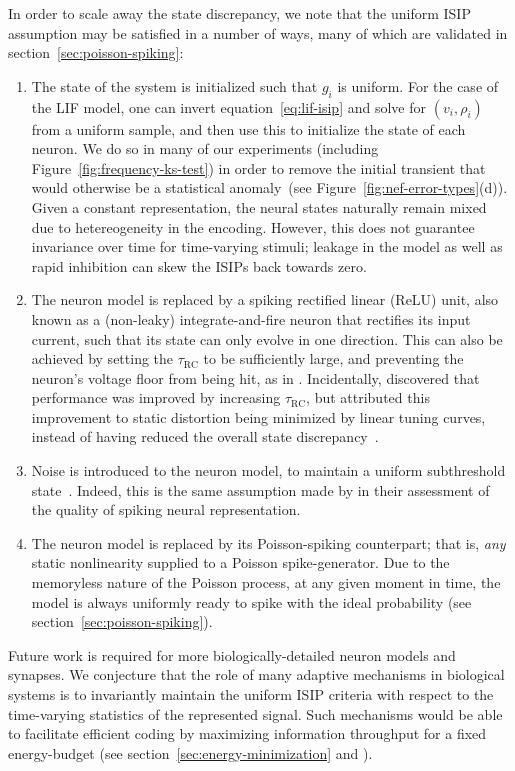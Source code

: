 In order to scale away the state discrepancy, we note that the uniform ISIP assumption may be satisfied in a number of ways, many of which are validated in
section~\ref{sec:poisson-spiking}:
\begin{enumerate}
\item The state of the system is initialized such that $g_i$ is uniform.
For the case of the LIF model, one can invert equation~\ref{eq:lif-isip} and solve for $(v_i, \rho_i)$ from a uniform sample, and then use this to initialize the state of each neuron.
We do so in many of our experiments (including Figure~\ref{fig:frequency-ks-test}) in order to remove the initial transient that would otherwise be a statistical anomaly~(see Figure~\ref{fig:nef-error-types}(d)).
Given a constant representation, the neural states naturally remain mixed due to hetereogeneity in the encoding.
However, this does not guarantee invariance over time for time-varying stimuli; leakage in the model as well as rapid inhibition can skew the ISIPs back towards zero.

\item The neuron model is replaced by a spiking rectified linear (ReLU) unit, also known as a (non-leaky) integrate-and-fire neuron that rectifies its input current, such that its state can only evolve in one direction.
This can also be achieved by setting the $\tau_\text{RC}$ to be sufficiently large, and preventing the neuron's voltage floor from being hit, as in \citet{boerlin2013predictive}.
Incidentally, \citet[][pp.~238--239]{eliasmith2003a} discovered that performance was improved by increasing $\tau_\text{RC}$, but attributed this improvement to static distortion being minimized by linear tuning curves, instead of having reduced the overall state discrepancy~\citep[also see][Appendix~F.1]{eliasmith2003a}.

\item Noise is introduced to the neuron model, to maintain a uniform subthreshold state~\citep[][pp.~132--133]{eliasmith2003a}.
Indeed, this is the same assumption made by \citet[][p.~134]{eliasmith2003a} in their assessment of the quality of spiking neural representation.

\item The neuron model is replaced by its Poisson-spiking counterpart; that is, \emph{any} static nonlinearity supplied to a Poisson spike-generator.
Due to the memoryless nature of the Poisson process, at any given moment in time, the model is always uniformly ready to spike with the ideal probability (see section~\ref{sec:poisson-spiking}).

\end{enumerate}
Future work is required for more biologically-detailed neuron models and synapses.
We conjecture that the role of many adaptive mechanisms in biological systems is to invariantly maintain the uniform ISIP criteria with respect to the time-varying statistics of the represented signal.
Such mechanisms would be able to facilitate efficient coding by maximizing information throughput for a fixed energy-budget (see section~\ref{sec:energy-minimization} and \citet[][pp.~127,~Table~4.1]{eliasmith2003a}).

